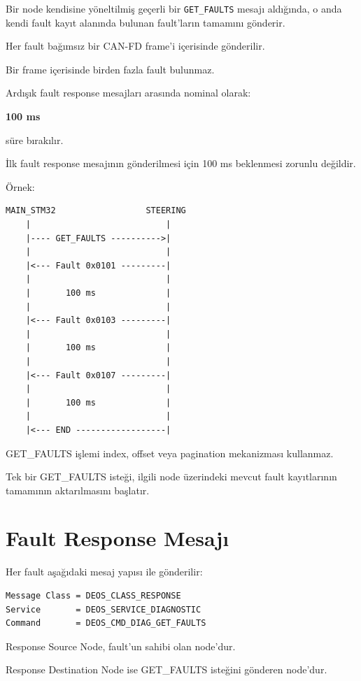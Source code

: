 \documentclass[a4paper,11pt]{article}
\begin{document}
Bir node kendisine yöneltilmiş geçerli bir
\texttt{GET\_FAULTS} mesajı aldığında, o anda kendi fault kayıt
alanında bulunan fault'ların tamamını gönderir.

Her fault bağımsız bir CAN-FD frame'i içerisinde gönderilir.

Bir frame içerisinde birden fazla fault bulunmaz.

Ardışık fault response mesajları arasında nominal olarak:

\begin{center}
\textbf{100 ms}
\end{center}

süre bırakılır.

İlk fault response mesajının gönderilmesi için 100 ms beklenmesi
zorunlu değildir.

Örnek:

\begin{lstlisting}
MAIN_STM32                  STEERING
    |                           |
    |---- GET_FAULTS ---------->|
    |                           |
    |<--- Fault 0x0101 ---------|
    |                           |
    |       100 ms              |
    |                           |
    |<--- Fault 0x0103 ---------|
    |                           |
    |       100 ms              |
    |                           |
    |<--- Fault 0x0107 ---------|
    |                           |
    |       100 ms              |
    |                           |
    |<--- END ------------------|
\end{lstlisting}

GET\_FAULTS işlemi index, offset veya pagination mekanizması kullanmaz.

Tek bir GET\_FAULTS isteği, ilgili node üzerindeki mevcut fault
kayıtlarının tamamının aktarılmasını başlatır.

\section{Fault Response Mesajı}

Her fault aşağıdaki mesaj yapısı ile gönderilir:

\begin{lstlisting}
Message Class = DEOS_CLASS_RESPONSE
Service       = DEOS_SERVICE_DIAGNOSTIC
Command       = DEOS_CMD_DIAG_GET_FAULTS
\end{lstlisting}

Response Source Node, fault'un sahibi olan node'dur.

Response Destination Node ise GET\_FAULTS isteğini gönderen node'dur.
\end{document}
